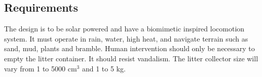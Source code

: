 \subsection{Requirements}

The design is to be solar powered and have a biomimetic inspired locomotion system.
It must operate in rain, water, high heat, and navigate terrain such as sand, mud, plants and bramble.
Human intervention should only be necessary to empty the litter container.
It should resist vandalism.
The litter collector size will vary from 1 to 5000 cm$^3$ and 1 to 5 kg.